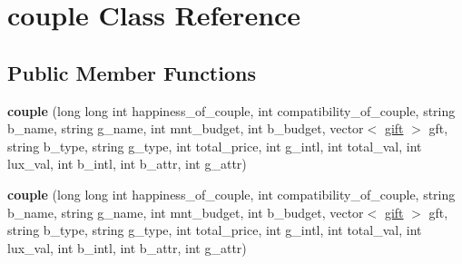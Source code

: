 \hypertarget{classcouple}{}\section{couple Class Reference}
\label{classcouple}
\subsection*{Public Member Functions}
\begin{DoxyCompactItemize}
\item 
\mbox{\label{classcouple_a44e38e9c0a12f8eaf33d538e736a0d65}} 
{\bfseries couple} (long long int happiness\+\_\+of\+\_\+couple, int compatibility\+\_\+of\+\_\+couple, string b\+\_\+name, string g\+\_\+name, int mnt\+\_\+budget, int b\+\_\+budget, vector$<$ \hyperlink{classgift}{gift} $>$ gft, string b\+\_\+type, string g\+\_\+type, int total\+\_\+price, int g\+\_\+intl, int total\+\_\+val, int lux\+\_\+val, int b\+\_\+intl, int b\+\_\+attr, int g\+\_\+attr)
\item 
\mbox{\label{classcouple_a44e38e9c0a12f8eaf33d538e736a0d65}} 
{\bfseries couple} (long long int happiness\+\_\+of\+\_\+couple, int compatibility\+\_\+of\+\_\+couple, string b\+\_\+name, string g\+\_\+name, int mnt\+\_\+budget, int b\+\_\+budget, vector$<$ \hyperlink{classgift}{gift} $>$ gft, string b\+\_\+type, string g\+\_\+type, int total\+\_\+price, int g\+\_\+intl, int total\+\_\+val, int lux\+\_\+val, int b\+\_\+intl, int b\+\_\+attr, int g\+\_\+attr)
\end{DoxyCompactItemize}
